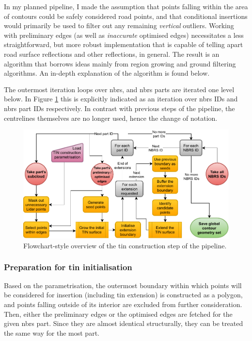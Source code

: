 In my planned pipeline, I made the assumption that points falling within the area of contours could be safely considered road points, and that conditional insertions would primarily be used to filter out any remaining \textit{vertical} outliers. Working with preliminary edges (as well as \textit{inaccurate} optimised edges) necessitates a less straightforward, but more robust implementation that is capable of telling apart road surface reflections and other reflections, in general. The result is an algorithm that borrows ideas mainly from region growing and ground filtering algorithms. An in-depth explanation of the algorithm is found below.

The outermost iteration loops over \ac{nbrs}, and \ac{nbrs} parts are iterated one level below. In Figure \ref{fig:tinconstructionflow} this is explicitly indicated as an iteration over \ac{nbrs} IDs and \ac{nbrs} part IDs respectively. In contrast with previous steps of the pipeline, the centrelines themselves are no longer used, hence the change of notation. 

\begin{figure}
    \centering
    \includegraphics[width=\linewidth]{final_report/figs/tin_construction.pdf}
    \caption{Flowchart-style overview of the \ac{tin} construction step of the pipeline.}
    \label{fig:tinconstructionflow}
\end{figure}

\subsubsection{Preparation for \ac{tin} initialisation}

Based on the parametrisation, the outermost boundary within which points will be considered for insertion (including \ac{tin} extension) is constructed as a polygon, and points falling outside of its interior are excluded from further consideration. Then, either the preliminary edges or the optimised edges are fetched for the given \ac{nbrs} part. Since they are almost identical structurally, they can be treated the same way for the most part.

